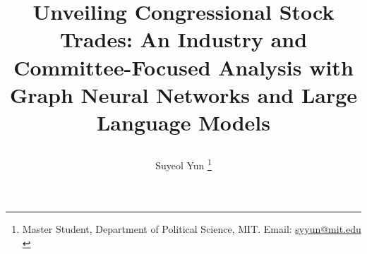 \documentclass[15pt,letterpaper]{article}
\newcommand{\tit}{
\Large \bf
Unveiling Congressional Stock Trades: An Industry and Committee-Focused Analysis with Graph Neural Networks and Large Language Models
}
\newcommand\spacingset[1]{\renewcommand{\baselinestretch}
{#1}\small\normalsize}
\begin{document}
\spacingset{1.25}

\setcounter{page}{0}
\vspace{-.1in}

{\title{
    \tit
  }
  \author{
    Suyeol Yun
  \thanks{Master Student, Department of Political Science, MIT. Email: \href{mailto:syyun@mit.edu}{syyun@mit.edu}\\
  }
  }
  \maketitle
}

\thispagestyle{empty}
\vspace{-.1in}
\end{document}
